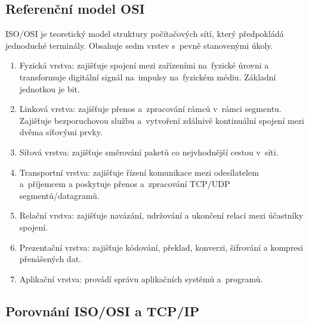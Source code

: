 \subsection{Referenční model OSI}

ISO/OSI je teoretický model struktury počítačových sítí, který předpokládá jednoduché terminály.
Obsahuje sedm vrstev s~pevně stanovenými úkoly.

\begin{enumerate}
    \item
          Fyzická vrstva:
          zajišťuje spojení mezi zařízeními na~fyzické úrovni a transformuje digitální signál na~impulsy na~fyzickém médiu.
          Základní jednotkou je bit.
    \item
          Linková vrstva:
          zajišťuje přenos a~zpracování rámců v~rámci segmentu.
          Zajišťuje bezporuchovou službu a~vytvoření zdálnivě kontinuální spojení mezi dvěma síťovými prvky.
    \item
          Síťová vrstva:
          zajišťuje směrování paketů co nejvhodnější cestou v~síti.
    \item
          Transportní vrstva:
          zajišťuje řízení komunikace mezi odesílatelem a~příjemcem a poskytuje přenos a~zpracování TCP/UDP segmentů/datagramů.
    \item
          Relační vrstva:
          zajišťuje navázání, udržování a ukončení relací mezi účastníky spojení.
    \item
          Prezentační vrstva:
          zajišťuje kódování, překlad, konverzi, šifrování a kompresi přenášených dat.
    \item
          Aplikační vrstva:
          provádí správu aplikačních systémů a~programů.
\end{enumerate}
\FloatBarrier


\subsection{Porovnání ISO/OSI a TCP/IP}

